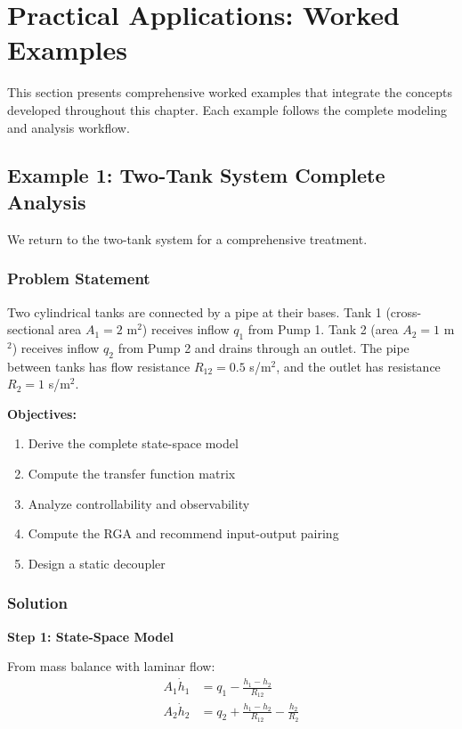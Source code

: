 \section{Practical Applications: Worked Examples}
\label{sec:practical_applications}

This section presents comprehensive worked examples that integrate the concepts developed throughout this chapter. Each example follows the complete modeling and analysis workflow.

\subsection{Example 1: Two-Tank System Complete Analysis}

We return to the two-tank system for a comprehensive treatment.

\subsubsection{Problem Statement}

Two cylindrical tanks are connected by a pipe at their bases. Tank 1 (cross-sectional area $A_1 = 2$ m$^2$) receives inflow $q_1$ from Pump 1. Tank 2 (area $A_2 = 1$ m$^2$) receives inflow $q_2$ from Pump 2 and drains through an outlet. The pipe between tanks has flow resistance $R_{12} = 0.5$ s/m$^2$, and the outlet has resistance $R_2 = 1$ s/m$^2$.

\textbf{Objectives:}
\begin{enumerate}
\item Derive the complete state-space model
\item Compute the transfer function matrix
\item Analyze controllability and observability
\item Compute the RGA and recommend input-output pairing
\item Design a static decoupler
\end{enumerate}

\subsubsection{Solution}

\textbf{Step 1: State-Space Model}

From mass balance with laminar flow:
\begin{align}
A_1 \dot{h}_1 &= q_1 - \frac{h_1 - h_2}{R_{12}} \\
A_2 \dot{h}_2 &= q_2 + \frac{h_1 - h_2}{R_{12}} - \frac{h_2}{R_2}
\end{align}


